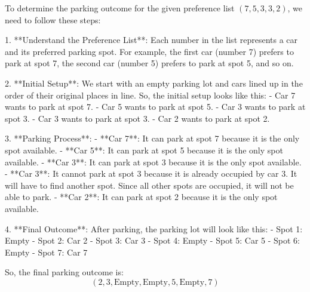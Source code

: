To determine the parking outcome for the given preference list \((7,5,3,3,2)\), we need to follow these steps:

1. **Understand the Preference List**: Each number in the list represents a car and its preferred parking spot. For example, the first car (number 7) prefers to park at spot 7, the second car (number 5) prefers to park at spot 5, and so on.

2. **Initial Setup**: We start with an empty parking lot and cars lined up in the order of their original places in line. So, the initial setup looks like this:
   - Car 7 wants to park at spot 7.
   - Car 5 wants to park at spot 5.
   - Car 3 wants to park at spot 3.
   - Car 3 wants to park at spot 3.
   - Car 2 wants to park at spot 2.

3. **Parking Process**:
   - **Car 7**: It can park at spot 7 because it is the only spot available.
   - **Car 5**: It can park at spot 5 because it is the only spot available.
   - **Car 3**: It can park at spot 3 because it is the only spot available.
   - **Car 3**: It cannot park at spot 3 because it is already occupied by car 3. It will have to find another spot. Since all other spots are occupied, it will not be able to park.
   - **Car 2**: It can park at spot 2 because it is the only spot available.

4. **Final Outcome**: After parking, the parking lot will look like this:
   - Spot 1: Empty
   - Spot 2: Car 2
   - Spot 3: Car 3
   - Spot 4: Empty
   - Spot 5: Car 5
   - Spot 6: Empty
   - Spot 7: Car 7

So, the final parking outcome is:
\[
\boxed{(2, 3, \text{Empty}, \text{Empty}, 5, \text{Empty}, 7)}
\]